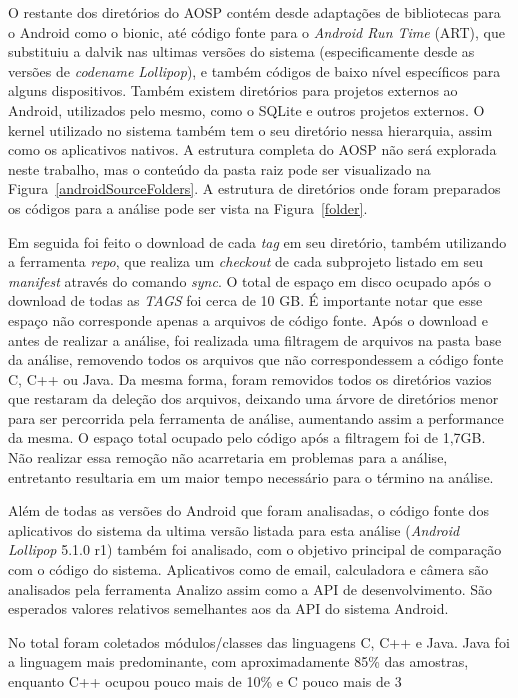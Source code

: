 O restante dos diretórios do AOSP contém desde adaptações de bibliotecas para o Android como o bionic, até código fonte para o \textit{Android Run Time} (ART), que substituiu a dalvik nas ultimas versões do sistema (especificamente desde as versões de \textit{codename Lollipop}), e também códigos de baixo nível específicos para alguns dispositivos. Também existem diretórios para projetos externos ao Android, utilizados pelo mesmo, como o SQLite e outros projetos externos. O kernel utilizado no sistema também tem o seu diretório nessa hierarquia, assim como os aplicativos nativos. A estrutura completa do AOSP não será explorada neste trabalho, mas o conteúdo da pasta raiz pode ser visualizado na Figura~\ref{androidSourceFolders}. A estrutura de diretórios onde foram preparados os códigos para a análise pode ser vista na Figura~\ref{folder}.

Em seguida foi feito o download de cada \textit{tag} em seu diretório, também utilizando a ferramenta \textit{repo}, que realiza um \textit{checkout} de cada subprojeto listado em seu \textit{manifest} através do comando \textit{sync}. O total de espaço em disco ocupado após o download de todas as \textit{TAGS} foi cerca de 10 GB. É importante notar que esse espaço não corresponde apenas a arquivos de código fonte. Após o download e antes de realizar a análise, foi realizada uma filtragem de arquivos na pasta base da análise, removendo todos os arquivos que não correspondessem a código fonte C, C++ ou Java. Da mesma forma, foram removidos todos os diretórios vazios que restaram da deleção dos arquivos, deixando uma árvore de diretórios menor para ser percorrida pela ferramenta de análise, aumentando assim a performance da mesma. O espaço total ocupado pelo código após a filtragem foi de 1,7GB. Não realizar essa remoção não acarretaria em problemas para a análise, entretanto resultaria em um maior tempo necessário para o término na análise.

Além de todas as versões do Android que foram analisadas, o código fonte dos aplicativos do sistema da ultima versão listada para esta análise (\textit{Android Lollipop} 5.1.0 r1) também foi analisado, com o objetivo principal de comparação com o código do sistema. Aplicativos como de email, calculadora e câmera são analisados pela ferramenta Analizo assim como a API de desenvolvimento. São esperados valores relativos semelhantes aos da API do sistema Android.

No total foram coletados módulos/classes das linguagens C, C++ e Java. Java foi a linguagem mais predominante, com aproximadamente 85\% das amostras, enquanto C++ ocupou pouco mais de 10\% e C pouco mais de 3%

